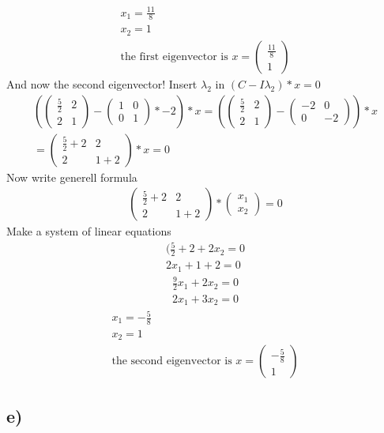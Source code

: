 \documentclass[12pt]{article}
\begin{document}
\begin{gather*}
    x_1 = \frac{11}{8}\\
    x_2 = 1 \\
    \text{the first eigenvector is } x = 
    \begin{pmatrix}
        \frac{11}{8} \\
        1 
   \end{pmatrix}
\end{gather*}
And now the second eigenvector!
Insert $\lambda_2$ in $(C - I\lambda_2) * x = 0 $
\begin{gather*}
    \left (
        \begin{pmatrix}
            \frac{5}{2} & 2 \\
            2 & 1 
    \end{pmatrix}
    -
   \begin{pmatrix}
       1 & 0 \\
            0 & 1 
    \end{pmatrix} 
    * -2  \right ) * x = 
    \left (
        \begin{pmatrix}
            \frac{5}{2} & 2 \\
            2 & 1 
    \end{pmatrix}
    -
   \begin{pmatrix}
       -2  & 0 \\
       0 & -2 
    \end{pmatrix} 
\right ) * x  \\
= \begin{pmatrix}
    \frac{5}{2} + 2  & 2 \\
    2 & 1 +2  
        \end{pmatrix} * x = 0 
\end{gather*}
Now  write generell formula
\begin{gather*}
 \begin{pmatrix}
     \frac{5}{2} +2 & 2 \\
     2 & 1 +2 
        \end{pmatrix}  
        *
        \begin{pmatrix}
            x_1 \\
            x_2
        \end{pmatrix}
        =
        0
\end{gather*}
Make a system of linear equations
\begin{align}
    (\frac{5}{2} + 2 + 2x_2 = 0  \\
    2x_1 +1 + 2 = 0 
\end{align}
\begin{align}
    \frac{9}{2}x_1 + 2x_2 = 0  \\
    2x_1 + 3x_2  = 0 
\end{align}
\begin{gather*}
    x_1 = -\frac{5}{8}\\
    x_2 = 1 \\
    \text{the second eigenvector is } x = 
    \begin{pmatrix}
        - \frac{5}{8}\\
        1
   \end{pmatrix}
\end{gather*}

\subsection{e)}
\end{document}
